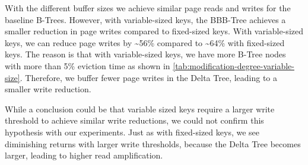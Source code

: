 With the different buffer sizes we achieve similar page reads and writes for the baseline B-Trees.
However, with variable-sized keys, the BBB-Tree achieves a smaller reduction in page writes compared to fixed-sized keys.
With variable-sized keys, we can reduce page writes by \textasciitilde56\% compared to \textasciitilde64\% with fixed-sized keys.
The reason is that with variable-sized keys, we have more B-Tree nodes with more than 5\% eviction time as shown in \autoref{tab:modification-degree-variable-size}.
Therefore, we buffer fewer page writes in the Delta Tree, leading to a smaller write reduction.

While a conclusion could be that variable sized keys require a larger write threshold to achieve similar write reductions, we could not confirm this hypothesis with our experiments.
Just as with fixed-sized keys, we see diminishing returns with larger write thresholds, because the Delta Tree becomes larger, leading to higher read amplification.

